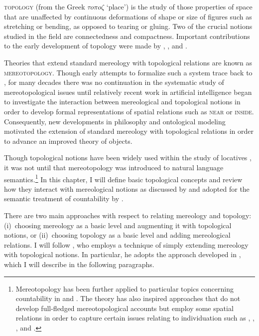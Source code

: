 \textsc{topology} (from the Greek $\tau o\pi o\zeta$ `place') is the study of those properties of space that are unaffected by continuous deformations of shape or size of figures such as stretching or bending, as opposed to tearing or gluing. Two of the crucial notions studied in the field are connectedness and compactness. Important contributions to the early development of topology were made by \citet{frechet1906quelques}, \citet{hausdorff1914grundzuge}, and \citet{kuratowski1922operation}. 

Theories that extend standard mereology with topological relations are  known as \textsc{mereotopology}. Though early attempts to formalize such a system trace back to \citet{whitehead1920concept,whitehead1929process}, for many decades there was no continuation in the systematic study of mereotopological issues until relatively recent work in artificial intelligence began to investigate the interaction between mereological and topological notions in order to develop formal representations of spatial relations such as \textsc{near} or \textsc{inside}. Consequently, new developments in philosophy and ontological modeling  \citep[e.g.,][]{clarke1981calculus,smith1996mereotopology,roeper1997region} motivated the extension of standard mereology with topological relations in order to advance an improved theory of objects.

Though topological notions have been widely used within the study of locatives \citep[e.g.,][]{clark1973space,herskovits1985semantics,zwarts_winter1997semantic,kracht2002semantics}, it was not until \citet{grimm2012degrees,grimm2012number} that mereotopology was introduced to natural language semantics.\footnote{Mereotopology has been further applied to particular topics concerning countability in \citet{lima2014all} and \citet{grimm_docekal-toappear-counting}. The theory has also inspired approaches that do not develop full-fledged mereotopological accounts but employ some spatial relations in order to capture certain issues relating to individuation such as \citet{scontras2014semantics,scontras2017new}, \citet{sutton_filip2017probabilistic,sutton_filip2017individuation}, \citet{henderson2017swarms}, and \citet{krifka-toappear-individuating}.} In this chapter, I will define basic topological concepts and review how they interact with mereological notions as discussed by \citet{casati_varzi1999parts} and adopted for the semantic treatment of countability by \citet{grimm2012degrees,grimm2012number}.

There are two main approaches with respect to relating mereology and topology: (i)~choosing mereology as a basic level and augmenting it with topological notions, or (ii)~choosing topology as a basic level and adding mereological relations. I will follow \citet{grimm2012number}, who employs a technique of simply extending mereology with topological notions. In particular, he adopts the approach developed in \citet{casati_varzi1999parts}, which I will describe in the following paragraphs.\largerpage

